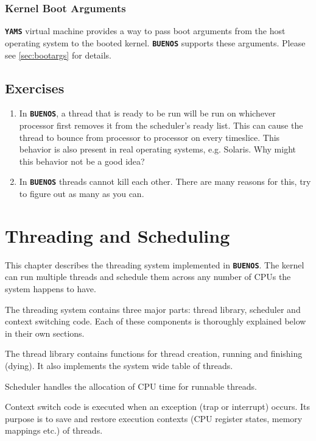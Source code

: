 \documentclass[twoside,a4paper]{report}
\newcommand{\buenos}{\texttt{\textbf{BUENOS}}}
\newcommand{\yams}{\texttt{\textbf{YAMS}}}
\newenvironment{exercises}[1][\addcontentsline{toc}{section}{Exercises}%
\section*{Exercises}\markright{EXERCISES}]{%
#1%
\begin{enumerate}%
}{%
\end{enumerate}
}
\newcounter{exercisec}[chapter]
\newcommand{\exercise}[1]{%
\item[\stepcounter{exercisec}\arabic{chapter}.\theexercisec{}.] #1%
}
\begin{document}
\subsection{Kernel Boot Arguments}


\yams{} virtual machine provides a way to pass boot arguments from the
host operating system to the booted kernel. \buenos{} supports these
arguments. Please see \autoref{sec:bootargs} for details.


\begin{exercises}

\exercise{In \buenos{}, a thread that is ready to be run will be run
on whichever processor first removes it from the scheduler's ready
list. This can cause the thread to bounce from processor to processor on
every timeslice. This behavior is also present in real operating
systems, e.g. Solaris. Why might this behavior not be a good idea?}

\exercise{In \buenos{} threads cannot kill each other. There are many
reasons for this, try to figure out as many as you can.}

\end{exercises}


\chapter{Threading and Scheduling}
\label{sec:threading}


This chapter describes the threading system implemented in \buenos{}.
The kernel can run multiple threads and schedule them across any
number of CPUs the system happens to have. 

The threading system contains three major parts: thread library,
scheduler and context switching code. Each of these components is
thoroughly explained below in their own sections.

The thread library contains functions for thread creation, running and
finishing (dying). It also implements the system wide table of threads.

Scheduler handles the allocation of CPU time for runnable threads.

Context switch code is executed when an exception (trap or interrupt)
occurs. Its purpose is to save and restore execution contexts (CPU
register states, memory mappings etc.) of threads.
\end{document}
